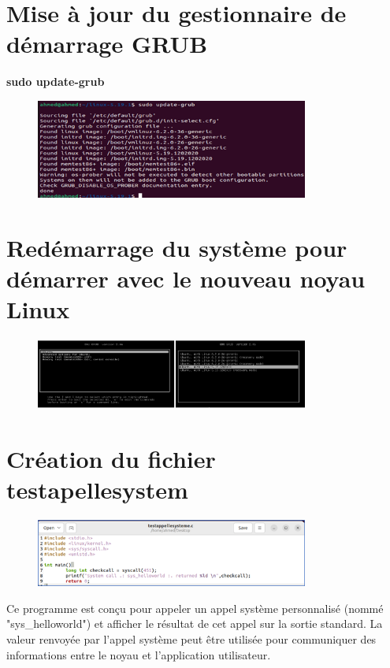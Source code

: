 \section{Mise à jour du gestionnaire de démarrage GRUB }
\textbf{sudo update-grub}
\begin{figure}[h]
    \includegraphics[width=0.8\textwidth]{images/41.png}   
\end{figure}

\section{Redémarrage du système pour démarrer avec le nouveau noyau Linux}
\begin{figure}[h]
    \includegraphics[width=0.8\textwidth]{images/42.png}   
\end{figure}

\section{Création du fichier testapellesystem }
\begin{figure}[h]
    \includegraphics[width=0.8\textwidth]{images/43.png}   
\end{figure}
Ce programme est conçu pour appeler un appel système personnalisé (nommé "sys\_helloworld") et afficher le résultat de cet appel sur la sortie standard. La valeur renvoyée par l'appel système peut être utilisée pour communiquer des informations entre le noyau et l'application utilisateur.

